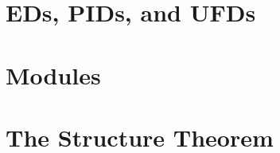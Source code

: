 \documentclass[../../../main.tex]{subfiles}
\begin{document}

\section{EDs, PIDs, and UFDs}
\section{Modules}
\section{The Structure Theorem}

\printbibliography[
    heading=subbibintoc,
    title={References}
]
\end{document}
